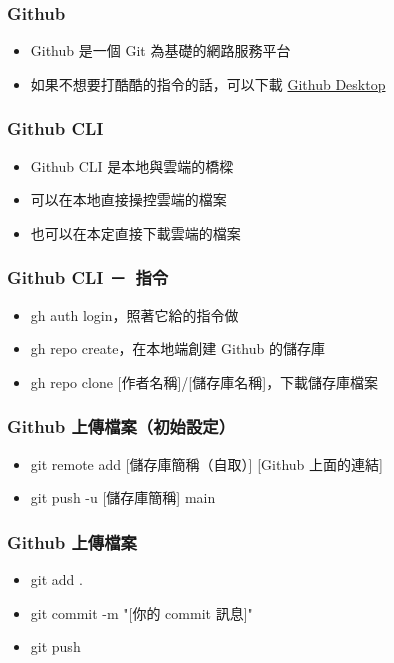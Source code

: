 \documentclass[mathserif]{beamer}
\begin{document}
\begin{frame}
    \frametitle{Github}
    \begin{itemize}
        \item Github 是一個 Git 為基礎的網路服務平台
        \item<2-> 如果不想要打酷酷的指令的話，可以下載 \href{https://desktop.github.com/}{Github Desktop}
    \end{itemize}
\end{frame}

\begin{frame}
    \frametitle{Github CLI}
    \begin{itemize}
        \item Github CLI 是本地與雲端的橋樑
        \item 可以在本地直接操控雲端的檔案
        \item 也可以在本定直接下載雲端的檔案
    \end{itemize}
\end{frame}

\begin{frame}
    \frametitle{Github CLI －\ 指令}
    \begin{itemize}
        \item {\color{red}gh auth login}，照著它給的指令做
        \item<2-> {\color{red}gh repo create}，在本地端創建 Github 的儲存庫
        \item<3-> {\color{red}gh repo clone [作者名稱]/[儲存庫名稱]}，下載儲存庫檔案
    \end{itemize}
\end{frame}

\begin{frame}
    \frametitle{Github 上傳檔案（初始設定）}
    \begin{itemize}
        \item {\color{red}git remote add [儲存庫簡稱（自取）] [Github 上面的連結]}
        \item {\color{red}git push -u [儲存庫簡稱] main}
    \end{itemize}
\end{frame}

\begin{frame}
    \frametitle{Github 上傳檔案}
    \begin{itemize}
        \item {\color{red}git add .}
        \item {\color{red}git commit -m "[你的 commit 訊息]"}
        \item {\color{red}git push}
    \end{itemize}
\end{frame}
\end{document}
